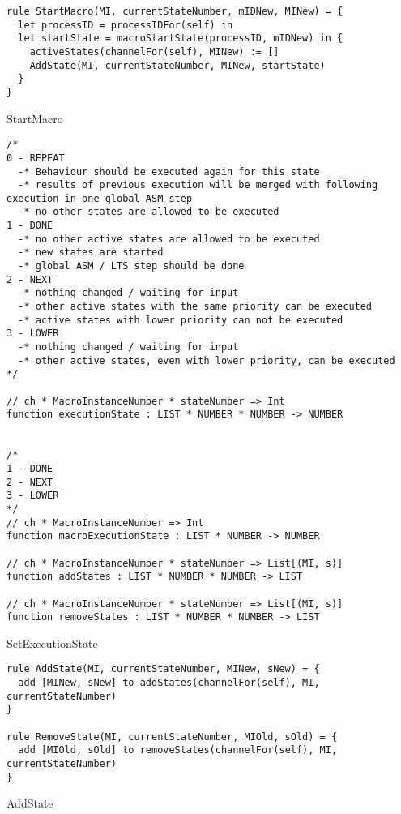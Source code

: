 \begin{listing}[H]
\begin{verbatim}
rule StartMacro(MI, currentStateNumber, mIDNew, MINew) = {
  let processID = processIDFor(self) in
  let startState = macroStartState(processID, mIDNew) in {
    activeStates(channelFor(self), MINew) := []
    AddState(MI, currentStateNumber, MINew, startState)
  }
}
\end{verbatim}
\caption{StartMacro}
\label{lst:asm:StartMacro}
\end{listing}




\begin{listing}[H]
\begin{verbatim}
/*
0 - REPEAT
  -* Behaviour should be executed again for this state
  -* results of previous execution will be merged with following execution in one global ASM step
  -* no other states are allowed to be executed
1 - DONE
  -* no other active states are allowed to be executed
  -* new states are started
  -* global ASM / LTS step should be done
2 - NEXT
  -* nothing changed / waiting for input
  -* other active states with the same priority can be executed
  -* active states with lower priority can not be executed
3 - LOWER
  -* nothing changed / waiting for input
  -* other active states, even with lower priority, can be executed
*/

// ch * MacroInstanceNumber * stateNumber => Int
function executionState : LIST * NUMBER * NUMBER -> NUMBER


/*
1 - DONE
2 - NEXT
3 - LOWER
*/
// ch * MacroInstanceNumber => Int
function macroExecutionState : LIST * NUMBER -> NUMBER

// ch * MacroInstanceNumber * stateNumber => List[(MI, s)]
function addStates : LIST * NUMBER * NUMBER -> LIST

// ch * MacroInstanceNumber * stateNumber => List[(MI, s)]
function removeStates : LIST * NUMBER * NUMBER -> LIST
\end{verbatim}
\caption{SetExecutionState}
\label{lst:asm:SetExecutionState}
\end{listing}




\begin{listing}[H]
\begin{verbatim}
rule AddState(MI, currentStateNumber, MINew, sNew) = {
  add [MINew, sNew] to addStates(channelFor(self), MI, currentStateNumber)
}

rule RemoveState(MI, currentStateNumber, MIOld, sOld) = {
  add [MIOld, sOld] to removeStates(channelFor(self), MI, currentStateNumber)
}
\end{verbatim}
\caption{AddState}
\label{lst:asm:AddState}
\end{listing}







